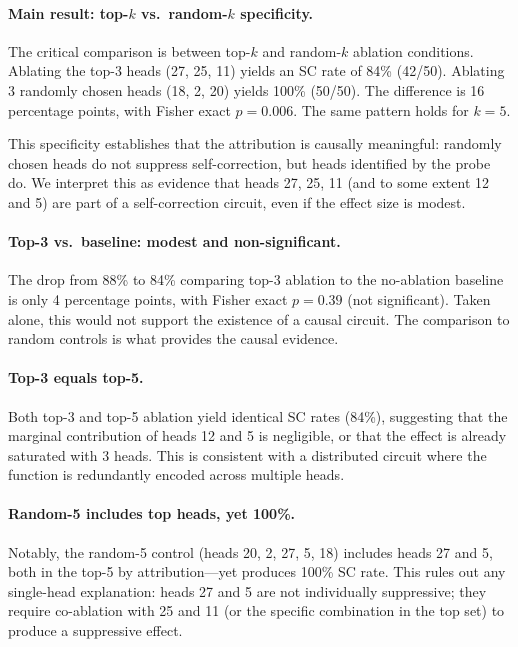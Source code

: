 \documentclass{article}
\begin{document}
\paragraph{Main result: top-$k$ vs.\ random-$k$ specificity.}
The critical comparison is between top-$k$ and random-$k$ ablation conditions.
Ablating the top-3 heads (27, 25, 11) yields an SC rate of 84\% (42/50).
Ablating 3 randomly chosen heads (18, 2, 20) yields 100\% (50/50).
The difference is 16 percentage points, with Fisher exact $p = 0.006$.
The same pattern holds for $k = 5$.

This specificity establishes that the attribution is causally meaningful: randomly chosen heads do not suppress self-correction, but heads identified by the probe do.
We interpret this as evidence that heads 27, 25, 11 (and to some extent 12 and 5) are part of a self-correction circuit, even if the effect size is modest.

\paragraph{Top-3 vs.\ baseline: modest and non-significant.}
The drop from 88\% to 84\% comparing top-3 ablation to the no-ablation baseline is only 4 percentage points, with Fisher exact $p = 0.39$ (not significant).
Taken alone, this would not support the existence of a causal circuit.
The comparison to random controls is what provides the causal evidence.

\paragraph{Top-3 equals top-5.}
Both top-3 and top-5 ablation yield identical SC rates (84\%), suggesting that the marginal contribution of heads 12 and 5 is negligible, or that the effect is already saturated with 3 heads.
This is consistent with a distributed circuit where the function is redundantly encoded across multiple heads.

\paragraph{Random-5 includes top heads, yet 100\%.}
Notably, the random-5 control (heads 20, 2, 27, 5, 18) includes heads 27 and 5, both in the top-5 by attribution---yet produces 100\% SC rate.
This rules out any single-head explanation: heads 27 and 5 are not individually suppressive; they require co-ablation with 25 and 11 (or the specific combination in the top set) to produce a suppressive effect.
\end{document}
